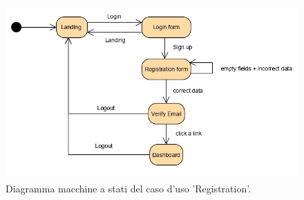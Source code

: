 
\begin{figure}[H]
	\centering
	\caption{Diagramma macchine a stati del caso d'uso 'Registration'.}
	\label{fig:diagramma-macchine-stati:registration}
	\includegraphics[width=\textwidth]{images/diagramma-macchine-stati/registration}
\end{figure}

